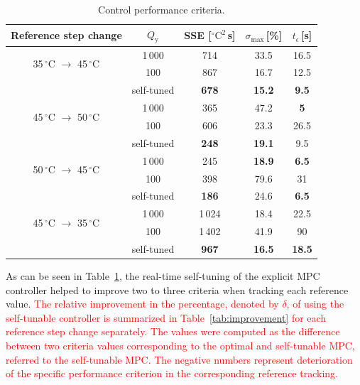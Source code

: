 \documentclass[preprint,12pt]{elsarticle}
\begin{document}
\begin{table}[h!]
	\begin{center}
		\caption{Control performance criteria.}
		\label{tab:control_performance}
		\begin{tabular}{c|c|c|c|c} 
			Reference step change & $Q_\mathrm{y}$ & SSE [$^{\circ}\mathrm{C}^2$\,s] & $\sigma_{\mathrm{max}}$\,[\%] & $t_{\epsilon}$\,[s]  \\
			\hline
			\multirow{2}{*}{ 35\,$^{\circ}$C $\rightarrow$ 45\,$^{\circ}$C } & 1\,000 & 714 & 33.5 & 16.5 \\
			& 100 & 867 & 16.7 & 12.5 \\ 
			& self-tuned & \textbf{678} & \textbf{15.2} & \textbf{9.5}  \\ 
			\hline
			\multirow{2}{*}{ 45\,$^{\circ}$C $\rightarrow$ 50\,$^{\circ}$C } & 1\,000 & 365 & 47.2 & \textbf{5} \\
			& 100 & 606 & 23.3 & 26.5  \\ 
			& self-tuned & \textbf{248} & \textbf{19.1} & 9.5  \\ 
			\hline
			\multirow{2}{*}{ 50\,$^{\circ}$C $\rightarrow$ 45\,$^{\circ}$C } & 1\,000 & 245 & \textbf{18.9} & \textbf{6.5}  \\
			& 100 & 398 & 79.6 & 31  \\ 
			& self-tuned & \textbf{186} & 24.6 & \textbf{6.5}  \\ 
			\hline
			\multirow{2}{*}{ 45\,$^{\circ}$C $\rightarrow$ 35\,$^{\circ}$C } & 1\,000 & 1\,024 & 18.4 & 22.5  \\
			& 100 & 1\,402 & 41.9 & 90  \\ 
			& self-tuned & \textbf{967} & \textbf{16.5} & \textbf{18.5}   
		\end{tabular}
	\end{center}
\end{table}

As can be seen in Table~\ref{tab:control_performance}, the real-time self-tuning of the explicit MPC controller helped to improve two to three criteria when tracking each reference value. 	
\textcolor{red}{The relative improvement in the percentage, denoted by $\delta$, of using the self-tunable controller is summarized in Table~\ref{tab:improvement} for each reference step change separately. The values were computed as the difference between two criteria values corresponding to the optimal and self-tunable MPC, referred to the self-tunable MPC. The negative numbers represent deterioration of the specific performance criterion in the corresponding reference tracking.} 
\end{document}
